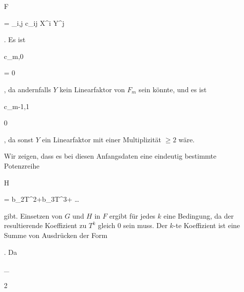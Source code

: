 {{{ F
}

{ = }{ \sum_{i,j} c_{ij} X^{i} Y^{j}
}

{  }{
}

{    }{
}

{   }{
}

}
{}{}{.}
Es ist


\mavergleichskette

{\vergleichskette

{ c_{m,0}
}

{ = }{ 0
}

{  }{
}

{    }{
}

{   }{
}

}
{}{}{,}
da andernfalls $Y$ kein Linearfaktor von $F_m$ sein könnte, und es ist


\mavergleichskette

{\vergleichskette

{ c_{m-1,1}
}

{ \neq }{ 0
}

{  }{
}

{    }{
}

{   }{
}

}
{}{}{,}
da sonst $Y$ ein Linearfaktor mit einer Multiplizität $\geq 2$ wäre.


Wir zeigen, dass es bei diesen Anfangsdaten eine eindeutig bestimmte Potenzreihe


\mavergleichskette

{\vergleichskette

{H
}

{ = }{b_2T^2+b_3T^3+ \ldots
}

{  }{
}

{    }{
}

{   }{
}

}
{}{}{}
gibt. Einsetzen von $G$ und $H$ in $F$ ergibt für jedes $k$ eine Bedingung, da der resultierende Koeffizient zu $T^k$ gleich $0$ sein muss. Der $k$-te Koeffizient ist eine Summe von Ausdrücken der Form


 {  }


 {} {.}
Da


\mavergleichskette

{\vergleichskette

{ \ell_\rho
}

{ \geq }{ 2
}

}}
